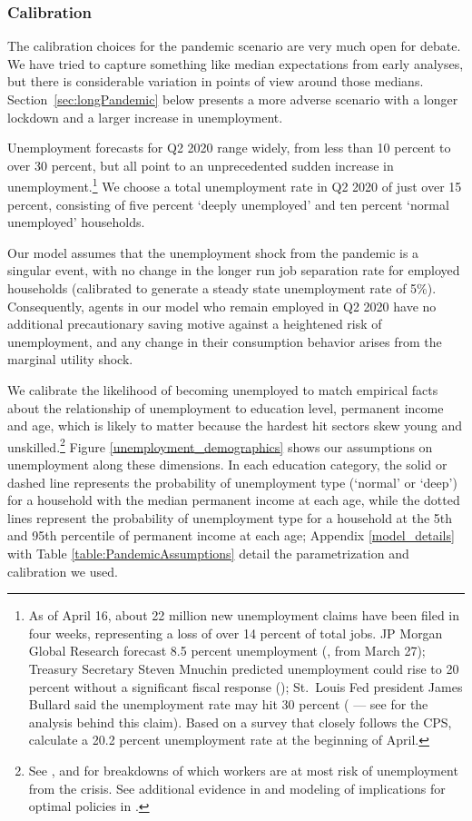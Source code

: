 \documentclass[titlepage,a4paper]{\econtex}
\begin{document}
\subsubsection{Calibration}
The calibration choices for the pandemic scenario are very much open for debate. We have tried to capture something like median expectations from early analyses, but there is considerable variation in points of view around those medians.
Section~\ref{sec:longPandemic} below presents a more adverse scenario with a longer lockdown and a larger increase in unemployment.

Unemployment forecasts for Q2 2020 range widely, from less than 10 percent to over 30 percent, but all point to an unprecedented sudden increase in unemployment.\footnote{As of April 16, about 22 million new unemployment claims have been filed in four weeks, representing a loss of over 14 percent  of total jobs.  JP Morgan Global Research forecast 8.5 percent unemployment (\cite{JPMorganBlog2020}, from March 27); Treasury Secretary Steven Mnuchin predicted unemployment could rise to 20 percent without a significant fiscal response (\cite{Bloomberg1}); St.\ Louis Fed president James Bullard said the unemployment rate may hit 30 percent  (\cite{Bloomberg2} --- see \cite{FariaBlog2020} for the analysis behind this claim).  Based on a survey that closely follows the CPS, \cite{BickBlandin2020} calculate a 20.2 percent unemployment rate at the beginning of April.}
We choose a total unemployment rate in Q2 2020 of just over 15 percent, consisting of five percent `deeply unemployed' and ten percent `normal unemployed' households.

Our model assumes that the unemployment shock from the pandemic is a singular event, with no change in the longer run job separation rate for employed households (calibrated to generate a steady state unemployment rate of 5\%).
Consequently, agents in our model who remain employed in Q2 2020 have no additional precautionary saving motive against a heightened risk of unemployment, and any change in their consumption behavior arises from the marginal utility shock.

We calibrate the likelihood of becoming unemployed to match empirical facts about the relationship of unemployment to education level, permanent income and age, which is likely to matter because the hardest hit sectors skew young and unskilled.\footnote{See \cite{GasconCOVID2020}, \cite{LeiboviciSocial2020} and \cite{covid_USsurvey} for breakdowns of which workers are at most risk of unemployment from the crisis.
  See additional evidence in \cite{kmv_pandemics} and modeling of implications for optimal policies in \cite{healthWealth}.}
Figure \ref{unemployment_demographics} shows our assumptions on unemployment along these dimensions.
In each education category, the solid or dashed line represents the probability of unemployment type (`normal' or `deep') for a household with the median permanent income at each age, while the dotted lines represent the probability of unemployment type for a household at the 5th and 95th percentile of permanent income at each age; Appendix \ref{model_details} with Table \ref{table:PandemicAssumptions} detail the parametrization and calibration we used.
\end{document}
